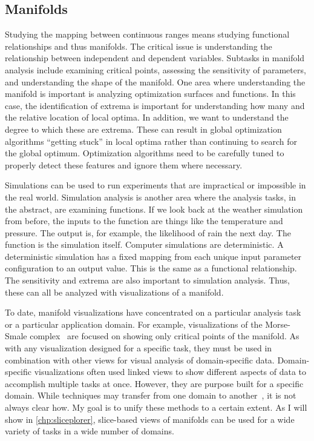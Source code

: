 \subsection{Manifolds}
\label{sec:manifolds}

Studying the mapping between continuous ranges means studying functional
relationships and thus manifolds.  The critical issue is understanding the
relationship between independent and dependent variables.  Subtasks in manifold
analysis include examining critical points, assessing the sensitivity of
parameters, and understanding the shape of the manifold.  
One area where
understanding the manifold is important is analyzing optimization surfaces and
functions.  In this case, the identification of extrema is important for
understanding how many and the relative location of local optima. In addition,
we want to understand the degree to which these are extrema. These can result
in global optimization algorithms ``getting stuck'' in local optima rather than
continuing to search for the global optimum. Optimization algorithms need to be
carefully tuned to properly detect these features and ignore them where
necessary.

Simulations can be used to run experiments that are impractical or impossible
in the real world.  Simulation analysis is another area where the analysis
tasks, in the abstract, are examining functions. If we look back at the weather
simulation from before, the inputs to the function are things like the
temperature and pressure.  The output is, for example, the likelihood of rain
the next day. The function is the simulation itself. Computer simulations are
deterministic.  A deterministic simulation has a fixed mapping from each unique
input parameter configuration to an output value. This is the same as a
functional relationship. The sensitivity and extrema are also important to
simulation analysis.  Thus, these can all be analyzed with visualizations of a
manifold.

To date, manifold visualizations have concentrated on a particular analysis
task or a particular application domain. For example, visualizations of the
Morse-Smale complex~\cite{Gerber:2010} are focused on showing only critical
points of the manifold. As with any visualization designed for a specific task,
they must be used in combination with other views for visual analysis of
domain-specific data. Domain-specific visualizations often used linked views to
show different aspects of data to accomplish multiple tasks at once. However,
they are purpose built for a specific domain. While techniques may transfer
from one domain to another~\cite{Sedlmair:2012}, it is not always clear how.
My goal is to unify these methods to a certain extent.  As I will show in
\autoref{chp:sliceplorer}, slice-based views of manifolds can be used for a
wide variety of tasks in a wide number of domains.

